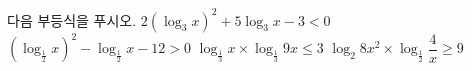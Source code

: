 다음 부등식을 푸시오.
 $2(\log_3 x)^2+5\log_3 x-3<0$
 $(\log_{\frac{1}{2}} x)^2-\log_{\frac{1}{2}} x-12>0$
 $\log_{\frac{1}{3}} x\times\log_{\frac{1}{3}} 9x\le 3$
 $\log_2 8x^2\times\log_{\frac{1}{2}}\dfrac{4}{x}\ge 9$
